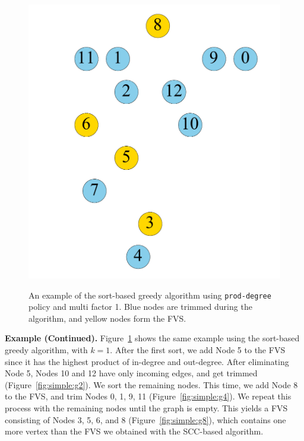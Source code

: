 \begin{figure}[t]
\begin{minipage}[b]{0.19\linewidth}
	\end{minipage}                  
	\begin{minipage}[b]{0.19\linewidth}
		\centering
		{\includegraphics[width=\textwidth]{./alg_fig/simple-g8}}
	\end{minipage}
	\caption{An example of the sort-based greedy algorithm using \texttt{prod-degree} policy and multi factor 1. Blue nodes are trimmed during the algorithm, and yellow nodes form the FVS.}
	\label{fig:simple}               
\end{figure}

{\bf Example (Continued).} Figure~\ref{fig:simple} shows the same example using the sort-based greedy algorithm, with $k = 1$. After the first sort, we add Node 5 to the FVS since it has the highest product of in-degree and out-degree. After eliminating Node 5, Nodes 10 and 12 have only incoming edges, and get trimmed (Figure~\ref{fig:simple:g2}). We sort the remaining nodes. This time, we add Node 8 to the FVS, and trim Nodes 0, 1, 9, 11 (Figure~\ref{fig:simple:g4}). We repeat this process with the remaining nodes until the graph is empty. This yields a FVS consisting of Nodes 3, 5, 6, and 8 (Figure~\ref{fig:simple:g8}), which contains one more vertex than the FVS we obtained with the SCC-based algorithm.

